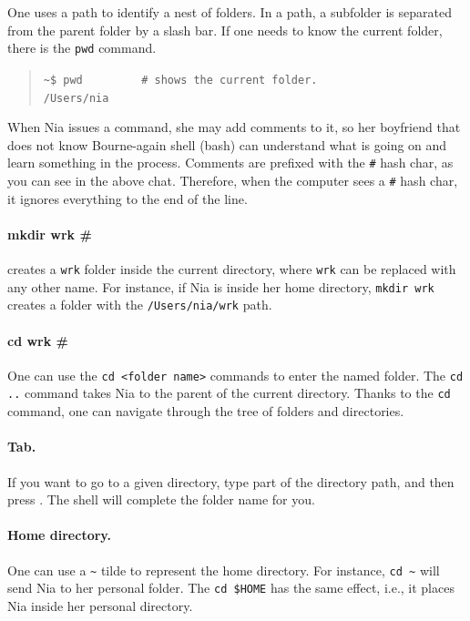 \documentclass[a4paper,12pt]{book}
\begin{document}
One uses a path to identify
a nest of folders. In a path, a subfolder
is separated from the parent folder
by a slash bar. If one needs to know
the current folder, there is the \verb|pwd|
command. 
\begin{quote}
\verb|~$ pwd         # shows the current folder. |\\
\verb|/Users/nia|\\
\end{quote}
When Nia issues a command, she may
add comments to it, so her boyfriend that
does not know Bourne-again shell (bash)
can understand what
is going on and learn something in
the process. Comments are prefixed
with the \verb|#| hash char, as you
can see in the above chat. Therefore,
when the computer sees a \verb|#|
hash char, it ignores everything to
the end of the line.

\paragraph{mkdir wrk \#}
creates a \verb|wrk|
folder inside the current directory,
where \verb|wrk| can be replaced
with any other name.
For instance, if Nia is inside her
home directory, \verb|mkdir wrk| creates
a folder with the \verb|/Users/nia/wrk| path.

\paragraph{cd wrk \#} 
One can use the
\verb|cd <folder name>| commands to enter
the named folder.
The \verb|cd ..|  command
takes Nia to the parent of the current
directory.
Thanks to the \verb|cd|
command, one can navigate through the
tree of folders and directories.

\paragraph{Tab.} If you want to go
to a given directory, type part of the directory
path, and then press .
The shell will complete the folder name for you.

\paragraph{Home directory.} One
can use a \verb|~| tilde to represent
the home directory. For instance,
\verb|cd ~| will send Nia to her
personal folder. The \verb|cd $HOME| has
the same effect, i.e., it places Nia inside
her personal directory.
\end{document}
